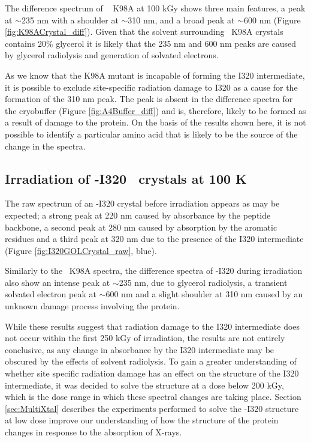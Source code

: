 The difference spectrum of \atpdx~ K98A at 100 kGy shows three main features, a peak at $\sim$235 nm with a shoulder at $\sim$310 nm, and a broad peak at $\sim$600 nm (Figure \ref{fig:K98ACrystal_diff}). Given that the solvent surrounding \atpdx ~K98A crystals contains 20\% glycerol it is likely that the 235 nm and 600 nm peaks are caused by glycerol radiolysis and generation of solvated electrons.

As we know that the K98A mutant is incapable of forming the I320 intermediate, it is possible to exclude site-specific radiation damage to I320 as a cause for the formation of the 310 nm peak. The peak is absent in the difference spectra for the cryobuffer (Figure \ref{fig:A4Buffer_diff}) and is, therefore, likely to be formed as a result of damage to the protein. On the basis of the results shown here, it is not possible to identify a particular amino acid that is likely to be the source of the change in the spectra.   

\FloatBarrier
\clearpage
\subsection{Irradiation of \atpdx -I320 ~crystals at 100 K}
The raw spectrum of an \atpdx -I320 crystal before irradiation appears as may be expected; a strong peak at 220 nm caused by absorbance by the peptide backbone, a second peak at 280 nm caused by absorption by the aromatic residues and a third peak at 320 nm due to the presence of the I320 intermediate (Figure \ref{fig:I320GOLCrystal_raw}, blue). 

Similarly to the \atpdx ~K98A spectra, the difference spectra of \atpdx -I320 during irradiation also show an intense peak at $\sim$235 nm, due to glycerol radiolysis, a transient solvated electron peak at $\sim$600 nm and a slight shoulder at 310 nm caused by an unknown damage process involving the protein. 

While these results suggest that radiation damage to the I320 intermediate does not occur within the first 250 kGy of irradiation, the results are not entirely conclusive, as any change in absorbance by the I320 intermediate may be obscured by the effects of solvent radiolysis. To gain a greater understanding of whether site specific radiation damage has an effect on the structure of the I320 intermediate, it was decided to solve the structure at a dose below 200 kGy, which is the dose range in which these spectral changes are taking place. Section \ref{sec:MultiXtal} describes the experiments performed to solve the \atpdx -I320 structure at low dose improve our understanding of how the structure of the protein changes in response to the absorption of X-rays. 
  
